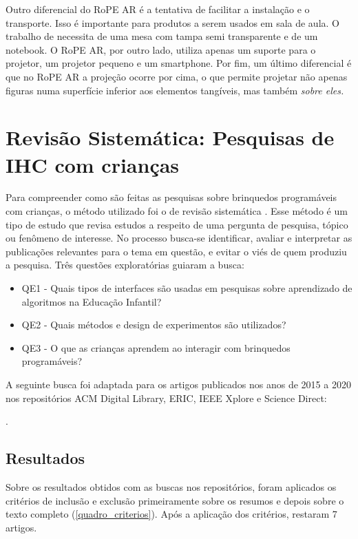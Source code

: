 {Outro diferencial do RoPE AR é a tentativa de facilitar a instalação e o transporte. Isso é importante para produtos a serem usados em sala de aula. O trabalho de  necessita de uma mesa com tampa semi transparente e de um notebook. O RoPE AR, por outro lado, utiliza apenas um suporte para o projetor, um projetor pequeno e um smartphone.
Por fim, um último diferencial é que no RoPE AR a projeção ocorre por cima, o que permite projetar não apenas figuras numa superfície inferior aos elementos tangíveis, mas também \it{sobre} eles.

\section{Revisão Sistemática: Pesquisas de IHC com crianças}
\label{sec_rsl}
Para compreender como são feitas as pesquisas sobre brinquedos programáveis com crianças, o método utilizado foi o de revisão sistemática \cite{kitchenham_guidelines_2007}. Esse método é um tipo de estudo que revisa estudos a respeito de uma pergunta de pesquisa, tópico ou fenômeno de interesse. No processo busca-se identificar, avaliar e interpretar as publicações relevantes para o tema em questão, e evitar o viés de quem produziu a pesquisa. Três questões exploratórias guiaram a busca:

\begin{itemize}
    \item QE1 - Quais tipos de interfaces são usadas em pesquisas sobre aprendizado de algoritmos na Educação Infantil?
    \item QE2 - Quais métodos e design de experimentos são utilizados?
    \item QE3 - O que as crianças aprendem ao interagir com brinquedos programáveis?
\end{itemize}

A seguinte busca foi adaptada para os artigos publicados nos anos de 2015 a 2020 nos repositórios ACM Digital Library, ERIC, IEEE Xplore e Science Direct:

.

\subsection{Resultados}

Sobre os resultados obtidos com as buscas nos repositórios, foram aplicados os critérios de inclusão e exclusão primeiramente sobre os resumos e depois sobre o texto completo (\autoref{quadro_criterios}). Após a aplicação dos critérios, restaram 7 artigos.

}
